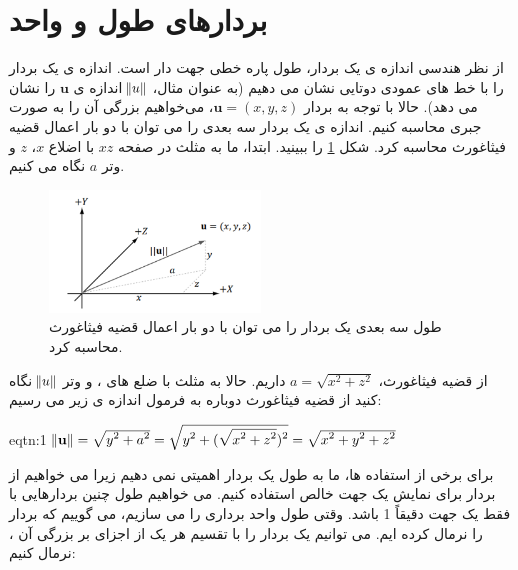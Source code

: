 \section{\textbf{بردارهای طول و واحد}}
{
    \Large
    \begin{spacing}{1.5}
        از نظر هندسی اندازه ی یک بردار، طول پاره خطی جهت دار است.
        اندازه ی یک بردار را با خط های عمودی دوتایی نشان می دهیم
        (به عنوان مثال، $\norm{u}$ اندازه ی $\textbf{u}$ را نشان می دهد).
        حالا با توجه به بردار $\textbf{u}=(x,y,z)$، می‌خواهیم بزرگی آن را به صورت جبری محاسبه کنیم.
        اندازه ی یک بردار سه بعدی را می توان با دو بار اعمال قضیه فیثاغورث محاسبه کرد.
        شکل \ref{fig:4.Session.1.1.8} را ببینید. ابتدا، ما به مثلث در صفحه $xz$ با اضلاع $x$، $z$ و وتر $a$ نگاه می کنیم.

        \begin{figure}[H]
            \centering
            \setlength{\belowcaptionskip}{-10pt}
            \includegraphics[width=0.5\textwidth]{Images/4/4.Session.1.1.8}
            \caption{طول سه بعدی یک بردار را می توان با دو بار اعمال قضیه فیثاغورث محاسبه کرد.}
            \label{fig:4.Session.1.1.8}
        \end{figure}

        از قضیه فیثاغورث، $a=\sqrt{\displaystyle x^2+z^2}$ داریم.
        حالا به مثلث با ضلع های ،  و وتر $\norm{u}$ نگاه کنید از قضیه فیثاغورث دوباره به فرمول اندازه ی زیر می رسیم:

        \begin{eqtn}{eqtn:1}
            \centering
            $\norm{\textbf{u}}=\sqrt{\displaystyle y^2+a^2}=\sqrt{\displaystyle y^2+(\sqrt{\displaystyle x^2+z^2})^2}=\sqrt{\displaystyle x^2+y^2+z^2}$
        \end{eqtn}

        برای برخی از استفاده ها، ما به طول یک بردار اهمیتی نمی دهیم زیرا می خواهیم از بردار برای نمایش یک جهت خالص استفاده کنیم.
        می خواهیم طول چنین بردارهایی با فقط یک جهت دقیقاً 1 باشد.
        وقتی طول واحد برداری را می سازیم، می گوییم که بردار را نرمال کرده ایم.
        می توانیم یک بردار را با تقسیم هر یک از اجزای بر بزرگی آن ، نرمال کنیم:


\end{spacing}}
